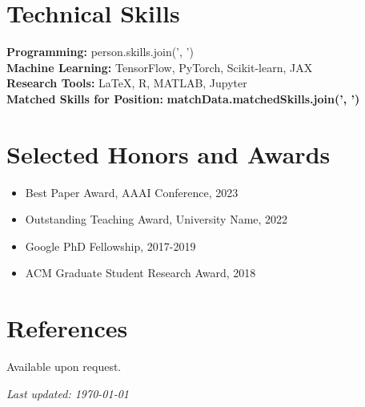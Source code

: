 \documentclass[11pt,a4paper]{article}
\begin{document}
\section{Technical Skills}
\textbf{Programming:} {{person.skills.join(', ')}}\\
\textbf{Machine Learning:} TensorFlow, PyTorch, Scikit-learn, JAX\\
\textbf{Research Tools:} LaTeX, R, MATLAB, Jupyter\\
\textbf{Matched Skills for Position:} \textbf{{{matchData.matchedSkills.join(', ')}}}

\section{Selected Honors and Awards}
\begin{itemize}[leftmargin=*, topsep=0pt]
    \item Best Paper Award, AAAI Conference, 2023
    \item Outstanding Teaching Award, University Name, 2022
    \item Google PhD Fellowship, 2017-2019
    \item ACM Graduate Student Research Award, 2018
\end{itemize}

\section{References}
Available upon request.

\vfill
\begin{center}
    \small\textit{Last updated: \today}
\end{center}
\end{document}

